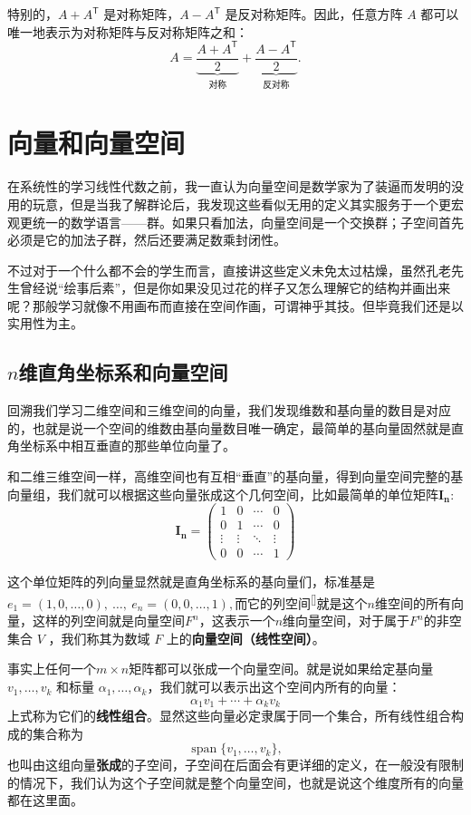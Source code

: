 \documentclass[UTF8]{ctexbook}
\begin{document}
特别的，$A + A^{\mathsf{T}}$ 是对称矩阵，$A - A^{\mathsf{T}}$ 是反对称矩阵。因此，任意方阵 $A$ 都可以唯一地表示为对称矩阵与反对称矩阵之和：
\[
A = \underbrace{\frac{A + A^{\mathsf{T}}}{2}}_{\text{对称}} + \underbrace{\frac{A - A^{\mathsf{T}}}{2}}_{\text{反对称}}.
\]




\newpage

\section{向量和向量空间}

在系统性的学习线性代数之前，我一直认为向量空间是数学家为了装逼而发明的没用的玩意，但是当我了解群论后，我发现这些看似无用的定义其实服务于一个更宏观更统一的数学语言——群。如果只看加法，向量空间是一个交换群；子空间首先必须是它的加法子群，然后还要满足数乘封闭性。

不过对于一个什么都不会的学生而言，直接讲这些定义未免太过枯燥，虽然孔老先生曾经说“绘事后素”，但是你如果没见过花的样子又怎么理解它的结构并画出来呢？那般学习就像不用画布而直接在空间作画，可谓神乎其技。但毕竟我们还是以实用性为主。

\subsection{$n$维直角坐标系和向量空间}

回溯我们学习二维空间和三维空间的向量，我们发现维数和基向量的数目是对应的，也就是说一个空间的维数由基向量数目唯一确定，最简单的基向量固然就是直角坐标系中相互垂直的那些单位向量了。

和二维三维空间一样，高维空间也有互相“垂直”的基向量，得到向量空间完整的基向量组，我们就可以根据这些向量张成这个几何空间，比如最简单的单位矩阵$\mathbf{I_n}$:
\[
\mathbf{I_n}=\begin{pmatrix}
1 & 0 & \cdots & 0 \\
0 & 1 & \cdots & 0 \\
\vdots & \vdots & \ddots & \vdots \\
0 & 0 & \cdots & 1
\end{pmatrix}
\]

这个单位矩阵的列向量显然就是直角坐标系的基向量们，标准基是$e_1=(1,0,\dots,0),\ \dots,\ e_n=(0,0,\dots,1),$而它的列空间\textsuperscript{[\pageref{cspace}]}\label{space}就是这个$n$维空间的所有向量，这样的列空间就是向量空间$F^n$，这表示一个$n$维向量空间，对于属于$F^n$的非空集合 $V$ ，我们称其为数域 $F$ 上的\textbf{向量空间（线性空间）}。


事实上任何一个$m\times n$矩阵都可以张成一个向量空间。就是说如果给定基向量 $v_1,\dots,v_k$ 和标量 $\alpha_1,\dots,\alpha_k$，我们就可以表示出这个空间内所有的向量：
\[
\alpha_1v_1+\cdots+\alpha_kv_k
\]
上式称为它们的\textbf{线性组合}。显然这些向量必定隶属于同一个集合，所有线性组合构成的集合称为
\[
\operatorname{span}\{v_1,\dots,v_k\},
\]
也叫由这组向量\textbf{张成}的子空间，子空间在后面会有更详细的定义，在一般没有限制的情况下，我们认为这个子空间就是整个向量空间，也就是说这个维度所有的向量都在这里面。
\end{document}
